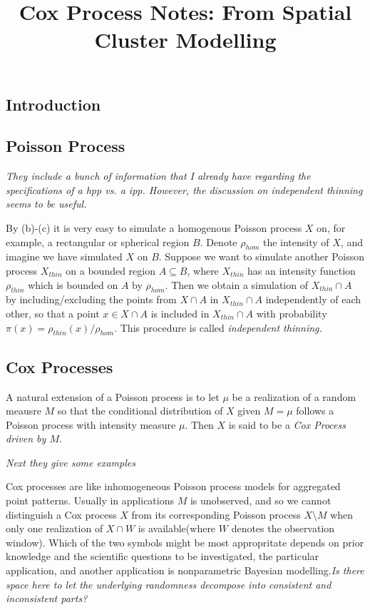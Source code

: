 \documentclass{article}
\title{Cox Process Notes: From Spatial Cluster Modelling}
\begin{document}
\maketitle
\subsection*{Introduction}
\subsection*{Poisson Process}
{\it They include a bunch of information that I already have regarding the specifications of a hpp vs. a ipp. However, the discussion on independent thinning seems to be useful.}

By (b)-(c) it is very easy to simulate a homogenous Poisson process $X$ on, for example, a rectangular or spherical region $B$. Denote $\rho_{hom}$ the intensity of $X$, and imagine we have simulated $X$ on $B$. Suppose we want to simulate another Poisson process $X_{thin}$ on a bounded region $A\subseteq B$, where $X_{thin}$ has an intensity function $\rho_{thin}$ which is bounded on $A$ by $\rho_{hom}$. Then we obtain a simulation of $X_{thin} \cap A$ by including/excluding the points from $X\cap A$ in $X_{thin} \cap A$ independently of each other, so that a point $x\in X\cap A$ is included in $X_{thin} \cap A$ with probability $\pi(x) = \rho_{thin}(x)/\rho_{hom}$. This procedure is called {\it independent thinning.}

\subsection*{Cox Processes}
A natural extension of a Poisson process is to let $\mu$ be a realization of a random meausre $M$ so that the conditional distribution of $X$ given $M = \mu$ follows a Poisson process with intensity measure $\mu$. Then $X$ is said to be a {\it Cox Process driven by $M$}. 

{\it Next they give some examples}

Cox processes are like inhomogeneous Poisson process models for aggregated point patterns. Usually in applications $M$ is unobserved, and so we cannot distinguish a Cox process $X$ from its corresponding Poisson process $X\setminus M$ when only one realization of $X\cap W$ is available(where $W$ denotes the observation window). Which of the two symbols might be most appropritate depends on prior knowledge and the scientific questions to be investigated, the particular application, and another application is nonparametric Bayesian modelling.{\it Is there space here to let the underlying randomness decompose into consistent and inconsistent parts?} 
\end{document}
